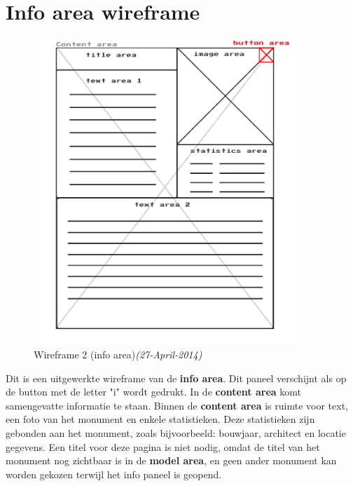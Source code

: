 \section{Info area wireframe} \label{sec:infowire}
\begin{figure}[h]
  \includegraphics[width=100mm]{figs/wireframe2.jpg}
  \caption{Wireframe 2 (info area)\textit{(27-April-2014)}}
  \label{fig:wireframe2}
\end{figure}

Dit is een uitgewerkte wireframe van de \textbf{info area}. Dit paneel verschijnt als op de button met de letter "i" wordt gedrukt. In de \textbf{{\color{gray}content area}} komt samengevatte informatie te staan. Binnen de \textbf{{\color{gray}content area}} is ruimte voor text, een foto van het monument en enkele statistieken. Deze statistieken zijn gebonden aan het monument, zoals bijvoorbeeld: bouwjaar, architect en locatie gegevens. Een titel voor deze pagina is niet nodig, omdat de titel van het monument nog zichtbaar is in de \textbf{model area}, en geen ander monument kan worden gekozen terwijl het info paneel is geopend.
\newpage
